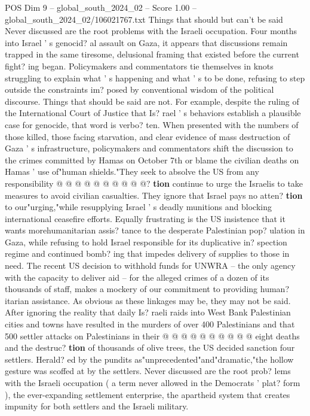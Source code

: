 \begin{textsample}{POS Dim 9 – global\_south\_2024\_02 – Score 1.00 – global\_south\_2024\_02/106021767.txt}  \label{ex:f9_pos_096}
Things that should but can't be said Never discussed are the root problems with the Israeli occupation.
Four months into Israel ' s genocid? al assault on Gaza, it appears that discussions remain trapped in the same tiresome, delusional framing that existed before the current fight? ing began.
Policymakers and commentators tie themselves in knots struggling to explain what ' s happening and what ' s to be done, refusing to step outside the constraints im? posed by conventional wisdom of the political discourse.
Things that should be said are not.
For example, despite the ruling of the International Court of Justice that Is? rael ' s behaviors establish a plausible case for genocide, that word is verbo? ten.
When presented with the numbers of those killed, those facing starvation, and clear evidence of mass destruction of Gaza ' s infrastructure, policymakers and commentators shift the discussion to the crimes committed by Hamas on October 7th or blame the civilian deaths on Hamas ' use of"human shields."They seek to absolve the US from any responsibility @ @ @ @ @ @ @ @ @ @? \textbf{tion} continue to urge the Israelis to take measures to avoid civilian casualties.
They ignore that Israel pays no atten? \textbf{tion} to our"urging,"while resupplying Israel ' s deadly munitions and blocking international ceasefire efforts.
Equally frustrating is the US insistence that it wants morehumanitarian assis? tance to the desperate Palestinian pop? ulation in Gaza, while refusing to hold Israel responsible for its duplicative in? spection regime and continued bomb? ing that impedes delivery of supplies to those in need.
The recent US decision to withhold funds for UNWRA -- the only agency with the capacity to deliver aid -- for the alleged crimes of a dozen of its thousands of staff, makes a mockery of our commitment to providing human? itarian assistance.
As obvious as these linkages may be, they may not be said.
After ignoring the reality that daily Is? raeli raids into West Bank Palestinian cities and towns have resulted in the murders of over 400 Palestinians and that 500 settler attacks on Palestinians in their @ @ @ @ @ @ @ @ @ @ eight deaths and the destruc? \textbf{tion} of thousands of olive trees, the US decided sanction four settlers.
Herald? ed by the pundits as"unprecedented"and"dramatic,"the hollow gesture was scoffed at by the settlers.
Never discussed are the root prob? lems with the Israeli occupation ( a term never allowed in the Democrats ' plat? form ), the ever-expanding settlement enterprise, the apartheid system that creates impunity for both settlers and the Israeli military.

\end{textsample}
